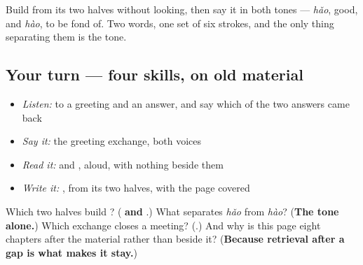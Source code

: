 Build \textbf{} from its two halves without looking, then say it in both tones — \emph{hǎo}, good, and \emph{hào}, to be fond of. Two words, one set of six strokes, and the only thing separating them is the tone.

\subsection*{Your turn — four skills, on old material}
\begin{itemize}
\raggedright
  \item \emph{Listen:} to a greeting and an answer, and say which of the two answers came back
  \item \emph{Say it:} the greeting exchange, both voices
  \item \emph{Read it:}  and , aloud, with nothing beside them
  \item \emph{Write it:} , from its two halves, with the page covered
\end{itemize}

\begin{tcolorbox}[breakable,colback=teal!4,colframe=teal!35!black,title={Before you move on}]
Which two halves build ? (\textbf{ and }.) What separates \emph{hǎo} from \emph{hào}? (\textbf{The tone alone.}) Which exchange closes a meeting? (\textbf{}.) And why is this page eight chapters after the material rather than beside it? (\textbf{Because retrieval after a gap is what makes it stay.})
\end{tcolorbox}
